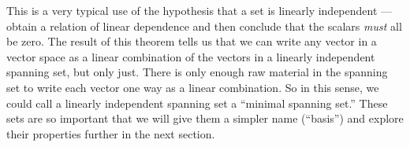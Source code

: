 %
This is a very typical use of the hypothesis that a set is linearly independent --- obtain a relation of linear dependence and then conclude that the scalars {\em must} all be zero.  The result of this theorem tells us that we can write any vector in a vector space as a linear combination of the vectors in a linearly independent spanning set, but only just.  There is only enough raw material in the spanning set to write each vector one way as a linear combination.  So in this sense, we could call a linearly independent spanning set a ``minimal spanning set.''  These sets are so important that we will give them a simpler name (``basis'') and explore their properties further in the next section.
%
%
